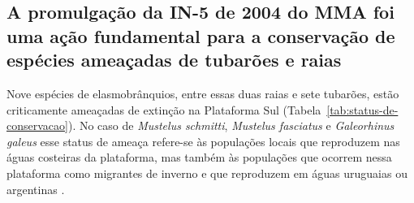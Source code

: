 \documentclass[a4paper,11pt,twoside,showtrims,onecolumn,openright,final]{memoir}
\begin{document}


\newpage

\subsection*{A promulgação da IN-5 de 2004 do MMA foi uma ação fundamental para  
             a conservação de espécies ameaçadas de tubarões e raias}
	  
Nove espécies de elasmobrânquios, entre essas duas raias e sete tubarões,  
estão criticamente ameaçadas de extinção na Plataforma Sul (Tabela~\ref{tab:status-de-conservacao}).  %
No caso de \emph{Mustelus schmitti}, \emph{Mustelus fasciatus} e \emph{Galeorhinus galeus} 
esse status de ameaça refere-se às populações locais que reproduzem nas águas 
costeiras da plataforma, mas também às populações que ocorrem nessa plataforma 
como migrantes de inverno e que reproduzem em águas uruguaias ou argentinas 
\citep[Capítulo~\ref{chap:fasciatus}]{miranda2003}. %

%
%
\end{document}

